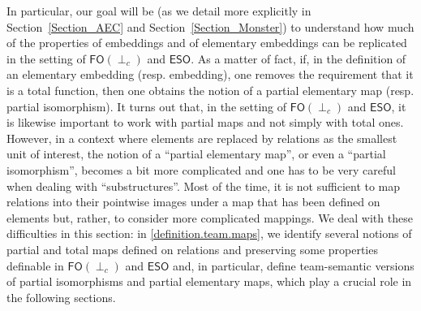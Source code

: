\documentclass[a4paper]{amsart}
\theoremstyle{definition}
\theoremstyle{remark}
\newcommand{\A}{\mathcal{A}}
\newcommand{\B}{\mathcal{B}}
\newcommand\eso{\mathsf{ESO}}
\newcommand\foil{\mathsf{FO}(\perp_c)}
\theoremstyle{definition}
\renewcommand{\A}{\mathfrak{A}}
\renewcommand{\B}{\mathfrak{B}}
\begin{document}
In particular, our goal will be (as we detail more explicitly in Section~\ref{Section_AEC} and Section~\ref{Section_Monster})  to understand how much of the properties of embeddings and of elementary embeddings can be replicated in the setting of $\foil$ and $\eso$. As a matter of fact, if, in the definition of an elementary embedding (resp. embedding), one removes the requirement that it is a total function, then one obtains the notion of a partial elementary map (resp. partial isomorphism). It turns out that, in the setting of $\foil$ and $\eso$, it is likewise important to work with partial maps and not simply with total ones.  However, in a context where elements are replaced by relations as the smallest unit of interest, the notion of a ``partial elementary map'', or even a ``partial isomorphism'', becomes a bit more complicated and one has to be very careful when dealing with ``substructures''. Most of the time, it is not sufficient to map relations into their pointwise images under a map that has been defined on elements but, rather, to consider more complicated mappings. We deal with these difficulties in this section: in \cref{definition.team.maps}, we identify several notions of partial and total maps defined on relations and preserving some properties definable in $\foil$ and $\eso$ and, in particular, define team-semantic versions of partial isomorphisms and partial elementary maps, which play a crucial role in the following sections.




\end{document}

